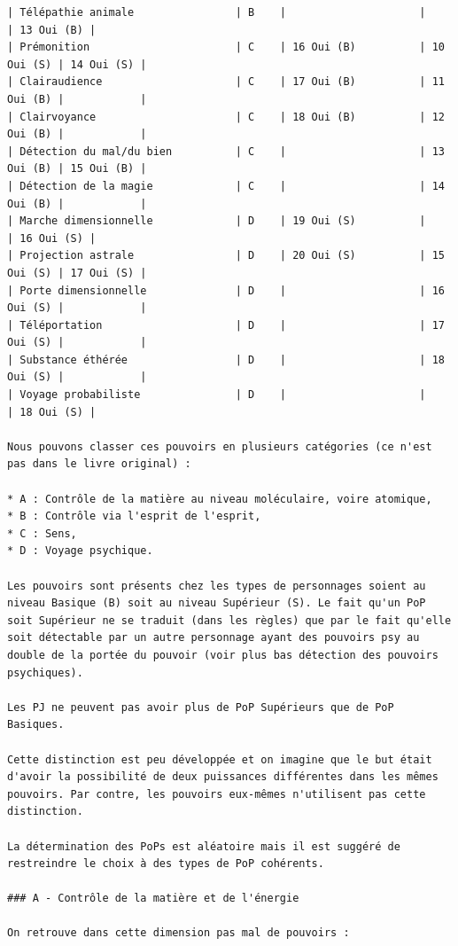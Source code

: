 \documentclass[11pt]{article}
\begin{document}
{\begin{verbatim}
| Télépathie animale                | B    |                     |            | 13 Oui (B) |
| Prémonition                       | C    | 16 Oui (B)          | 10 Oui (S) | 14 Oui (S) |
| Clairaudience                     | C    | 17 Oui (B)          | 11 Oui (B) |            |
| Clairvoyance                      | C    | 18 Oui (B)          | 12 Oui (B) |            |
| Détection du mal/du bien          | C    |                     | 13 Oui (B) | 15 Oui (B) |
| Détection de la magie             | C    |                     | 14 Oui (B) |            |
| Marche dimensionnelle             | D    | 19 Oui (S)          |            | 16 Oui (S) |
| Projection astrale                | D    | 20 Oui (S)          | 15 Oui (S) | 17 Oui (S) |
| Porte dimensionnelle              | D    |                     | 16 Oui (S) |            |
| Téléportation                     | D    |                     | 17 Oui (S) |            |
| Substance éthérée                 | D    |                     | 18 Oui (S) |            |
| Voyage probabiliste               | D    |                     |            | 18 Oui (S) |

Nous pouvons classer ces pouvoirs en plusieurs catégories (ce n'est pas dans le livre original) :

* A : Contrôle de la matière au niveau moléculaire, voire atomique,
* B : Contrôle via l'esprit de l'esprit,
* C : Sens,
* D : Voyage psychique.

Les pouvoirs sont présents chez les types de personnages soient au niveau Basique (B) soit au niveau Supérieur (S). Le fait qu'un PoP soit Supérieur ne se traduit (dans les règles) que par le fait qu'elle soit détectable par un autre personnage ayant des pouvoirs psy au double de la portée du pouvoir (voir plus bas détection des pouvoirs psychiques).

Les PJ ne peuvent pas avoir plus de PoP Supérieurs que de PoP Basiques.

Cette distinction est peu développée et on imagine que le but était d'avoir la possibilité de deux puissances différentes dans les mêmes pouvoirs. Par contre, les pouvoirs eux-mêmes n'utilisent pas cette distinction.

La détermination des PoPs est aléatoire mais il est suggéré de restreindre le choix à des types de PoP cohérents.

### A - Contrôle de la matière et de l'énergie

On retrouve dans cette dimension pas mal de pouvoirs :


\end{verbatim}}
\end{document}
